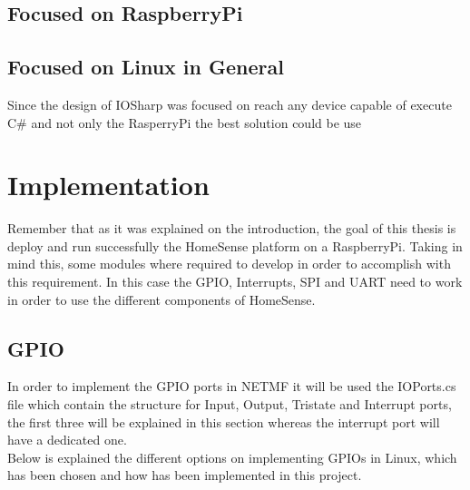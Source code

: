 \subsection{Focused on RaspberryPi}\label{SS:}
\subsection{Focused on Linux in General}\label{SS:}
Since the design of IOSharp was focused on reach any device capable of execute C\# and not only the RasperryPi the best solution could be use 

\section{Implementation}\label{S:Implementation}
Remember that as it was explained on the introduction, the goal of this thesis is deploy and run successfully the HomeSense platform on a RaspberryPi. Taking in mind this, some modules where required to develop in order to accomplish with this requirement. In this case the GPIO, Interrupts, SPI and UART need to work in order to use the different components of HomeSense.

\subsection{GPIO}\label{SS:GPIO}
In order to implement the GPIO ports in NETMF it will be used the IOPorts.cs file which contain the structure for Input, Output, Tristate and Interrupt ports, the first three will be explained in this section whereas the interrupt port will have a dedicated one.
\\
Below is explained the different options on implementing GPIOs in Linux, which has been chosen and how has been implemented in this project.

